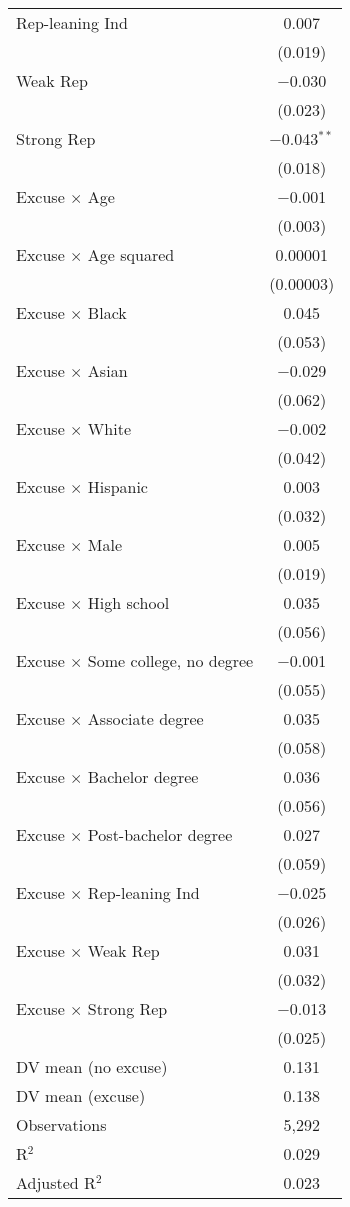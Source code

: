 \begin{center}
\begin{ThreePartTable}
\begin{longtable}{lc}
 \addlinespace 
 Rep-leaning Ind & 0.007 \\ 
  & (0.019) \\ 
 \addlinespace 
 Weak Rep & $-$0.030 \\ 
  & (0.023) \\ 
 \addlinespace 
 Strong Rep & $-$0.043$^{**}$ \\ 
  & (0.018) \\ 
 \addlinespace 
 Excuse $\times$ Age & $-$0.001 \\ 
  & (0.003) \\ 
 \addlinespace 
 Excuse $\times$ Age squared & 0.00001 \\ 
  & (0.00003) \\ 
 \addlinespace 
 Excuse $\times$ Black & 0.045 \\ 
  & (0.053) \\ 
 \addlinespace 
 Excuse $\times$ Asian & $-$0.029 \\ 
  & (0.062) \\ 
 \addlinespace 
 Excuse $\times$ White & $-$0.002 \\ 
  & (0.042) \\ 
 \addlinespace 
 Excuse $\times$ Hispanic & 0.003 \\ 
  & (0.032) \\ 
 \addlinespace 
 Excuse $\times$ Male & 0.005 \\ 
  & (0.019) \\ 
 \addlinespace 
 Excuse $\times$ High school & 0.035 \\ 
  & (0.056) \\ 
 \addlinespace 
 Excuse $\times$ Some college, no degree & $-$0.001 \\ 
  & (0.055) \\ 
 \addlinespace 
 Excuse $\times$ Associate degree & 0.035 \\ 
  & (0.058) \\ 
 \addlinespace 
 Excuse $\times$ Bachelor degree & 0.036 \\ 
  & (0.056) \\ 
 \addlinespace 
 Excuse $\times$ Post-bachelor degree & 0.027 \\ 
  & (0.059) \\ 
 \addlinespace 
 Excuse $\times$ Rep-leaning Ind & $-$0.025 \\ 
  & (0.026) \\ 
 \addlinespace 
 Excuse $\times$ Weak Rep & 0.031 \\ 
  & (0.032) \\ 
 \addlinespace 
 Excuse $\times$ Strong Rep & $-$0.013 \\ 
  & (0.025) \\ 
 \addlinespace 
DV mean (no excuse) & 0.131 \\
DV mean (excuse) & 0.138 \\
 \addlinespace 
\midrule  
Observations & 5,292 \\ 
R$^{2}$ & 0.029 \\ 
Adjusted R$^{2}$ & 0.023 \\ 
\end{longtable}
\end{ThreePartTable}
\end{center}
